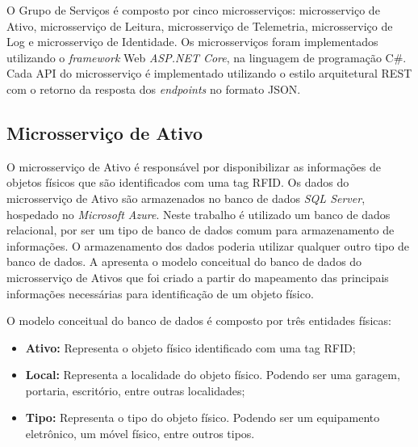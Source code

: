 
O Grupo de Serviços é composto por cinco microsserviços: microsserviço de Ativo, microsserviço de Leitura, microsserviço de Telemetria, microsserviço de Log e microsserviço de Identidade. Os microsserviços foram implementados utilizando o \textit{framework} Web \textit{ASP.NET Core}, na linguagem de programação C\#. Cada \acrfull{API} do microsserviço é implementado utilizando o estilo arquitetural \acrfull{REST} com o retorno da resposta dos \textit{endpoints} no formato \acrshort{JSON}.

\newpage

\subsection{Microsserviço de Ativo}

O microsserviço de Ativo é responsável por disponibilizar as informações de objetos físicos que são identificados com uma tag \acrshort{RFID}. Os dados do microsserviço de Ativo são armazenados no banco de dados \textit{SQL Server}, hospedado no \textit{Microsoft Azure}. Neste trabalho é utilizado um banco de dados relacional, por ser um tipo de banco de dados comum para armazenamento de informações. O armazenamento dos dados poderia utilizar qualquer outro tipo de banco de dados. A  apresenta o modelo conceitual do banco de dados do microsserviço de Ativos que foi criado a partir do mapeamento das principais informações necessárias para identificação de um objeto físico.


O modelo conceitual do banco de dados é composto por três entidades físicas:

\begin{itemize}
    \item \textbf{Ativo:} Representa o objeto físico identificado com uma tag \acrshort{RFID};
    \item \textbf{Local:} Representa a localidade do objeto físico. Podendo ser uma garagem, portaria, escritório, entre outras localidades;
    \item \textbf{Tipo:} Representa o tipo do objeto físico. Podendo ser um equipamento eletrônico, um móvel físico, entre outros tipos.
\end{itemize}

